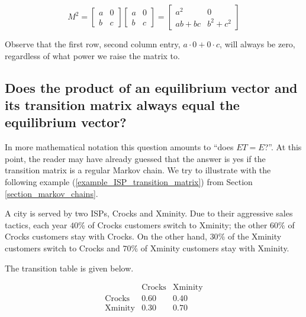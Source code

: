 \begin{solution}
\begin{enumerate}
              \[ M^2 = \begin{bmatrix}
                      a & 0 \\
                      b & c
                  \end{bmatrix} \begin{bmatrix}
                      a & 0 \\
                      b & c
                  \end{bmatrix} = \begin{bmatrix}
                      a^2     & 0         \\
                      ab + bc & b^2 + c^2
                  \end{bmatrix} \]

              Observe that the first row, second column entry, \( a \cdot 0 + 0 \cdot c \), will always be zero, regardless of what power we raise the matrix to.
    \end{enumerate}
\end{solution}




\subsection{Does the product of an equilibrium vector and its transition matrix always equal the equilibrium vector?}

In more mathematical notation this question amounts to ``does $ET = E$?''. At this point, the reader may have already guessed that the answer is yes if the transition matrix is a regular Markov chain.  We try to illustrate with the following example (\ref{example_ISP_transition_matrix}) from Section \ref{section_markov_chains}.

A city is served by two ISPs, Crocks and Xminity. Due to their aggressive sales tactics, each year \( 40\% \) of Crocks customers switch to Xminity; the other \( 60\% \) of Crocks customers stay with Crocks. On the other hand, \( 30\% \) of the Xminity customers switch to Crocks and \( 70\% \) of Xminity customers stay with Xminity.

The transition table is given below.

\[
    \begin{array}{c|cc}
                       & \text{Crocks} & \text{Xminity} \\
        \hline
        \text{Crocks}  & 0.60          & 0.40           \\
        \text{Xminity} & 0.30          & 0.70           \\
    \end{array}
\]

